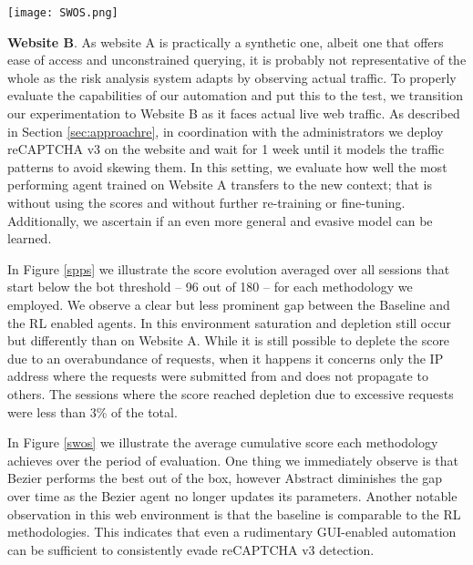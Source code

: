

\begin{figure*}[ht!]
\centerline{\texttt{[image: SWOS.png]}}
\caption{Average cumulative score over the period of evaluation, for Website A and Website B.}
\label{swos}
\end{figure*}

\textbf{Website B}. As website A is practically a synthetic one, albeit one that offers ease of access and unconstrained querying, it is probably not representative of the whole as the risk analysis system adapts by observing actual traffic.
To properly evaluate the capabilities of our automation and put this to the test, we transition our experimentation to Website B as it faces actual live web traffic.
As described in Section \ref{sec:approachre}, in coordination with the administrators we deploy reCAPTCHA v3 on the website and wait for 1 week until it models the traffic patterns to avoid skewing them.
In this setting, we  evaluate how well the most performing agent trained on Website A transfers to the new context; that is without using the scores and without further re-training or fine-tuning.
Additionally, we ascertain if an even more general and evasive model can be learned.

In Figure \ref{spps} we illustrate the score evolution averaged over all sessions that start below the bot threshold -- 96 out of 180 -- for each methodology we employed.
We observe a clear but less prominent gap between the Baseline and the \gls{RL} enabled agents.
In this environment saturation and depletion still occur but differently than on Website A.
While it is still possible to deplete the score due to an overabundance of requests, when it happens it concerns only the IP address where the requests were submitted from and does not propagate to others.
The sessions where the score reached depletion due to excessive requests were less than 3\% of the total.

In Figure \ref{swos} we illustrate the average cumulative score each methodology achieves over the period of evaluation.
One thing we immediately observe is that Bezier performs the best out of the box, however Abstract diminishes the gap over time as the Bezier agent no longer updates its parameters.
Another notable observation in this web environment is that the baseline is comparable to the \gls{RL} methodologies.
This indicates that even a rudimentary GUI-enabled automation can be sufficient to consistently evade reCAPTCHA v3 detection.

